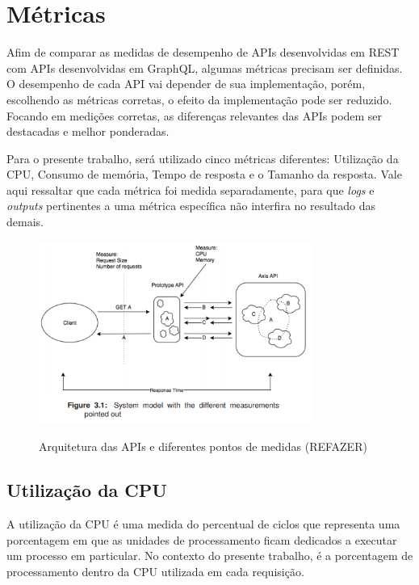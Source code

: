 \section{Métricas}\label{sec:metrics}

Afim de comparar as medidas de desempenho de APIs desenvolvidas em REST com APIs desenvolvidas em GraphQL, algumas métricas precisam ser definidas. O desempenho de cada API vai depender de sua implementação, porém, escolhendo as métricas corretas, o efeito da implementação pode ser reduzido. Focando em medições corretas, as diferenças relevantes das APIs podem ser destacadas e melhor ponderadas.

Para o presente trabalho, será utilizado cinco métricas diferentes: Utilização da CPU, Consumo de memória, Tempo de resposta e o Tamanho da resposta. Vale aqui ressaltar que cada métrica foi medida separadamente, para que \textit{logs} e \textit{outputs} pertinentes a uma métrica específica não interfira no resultado das demais.

\begin{figure}[htbp]
\centering
\includegraphics[width=0.8\textwidth]{figuras/metricas.PNG}
\label{fig:my-model}
\caption{Arquitetura das APIs e diferentes pontos de medidas (REFAZER)}
\author{fonte: Autor}
\end{figure}
\pagebreak


\subsection*{Utilização da CPU}

A utilização da CPU é uma medida do percentual de ciclos que representa uma porcentagem em que as unidades de processamento ficam dedicados a executar um processo em particular. No contexto do presente trabalho, é a porcentagem de processamento dentro da CPU utilizada em cada requisição.

